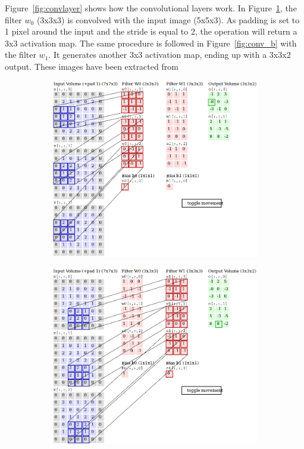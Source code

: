 \begin{description}
	Figure~\ref{fig:convlayer} shows how the convolutional layers work. In Figure~\ref{fig:conv_a}, the filter $w_0$ (3x3x3) is convolved with the input image (5x5x3). As padding is set to 1 pixel around the input and the stride is equal to 2, the operation will return a 3x3 activation map. The same procedure is followed in Figure~\ref{fig:conv_b} with the filter $w_1$. It generates another 3x3 activation map, ending up with a 3x3x2 output. These images have been extracted from~\cite{cs231n}
	
	\begin{figure}
		\centering
		\begin{subfigure}{0.7\textwidth}
			\centering
			\includegraphics[width=1\linewidth]{figures/convlayer_anime1big.png}
			\caption{}\label{fig:conv_a}
		\end{subfigure}
		\begin{subfigure}{0.7\textwidth}
			\centering
			\includegraphics[width=1\linewidth]{figures/convlayer_anime2big.png}

\end{subfigure}
\end{figure}
\end{description}
